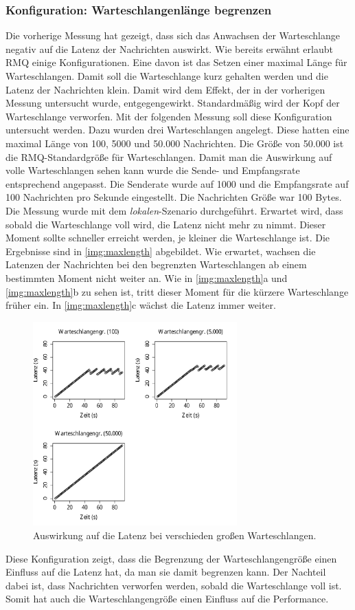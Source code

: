 \subsubsection{Konfiguration: Warteschlangenlänge begrenzen}
\label{sec:maxlength}
Die vorherige Messung hat gezeigt, dass sich das Anwachsen der Warteschlange negativ auf die Latenz der Nachrichten auswirkt. Wie bereits erwähnt erlaubt RMQ einige Konfigurationen. Eine davon ist das Setzen einer maximal Länge für Warteschlangen. Damit soll die Warteschlange kurz gehalten werden und die Latenz der Nachrichten klein. Damit wird dem Effekt, der in der vorherigen Messung untersucht wurde, entgegengewirkt. Standardmäßig wird der Kopf der Warteschlange verworfen. Mit der folgenden Messung soll diese Konfiguration untersucht werden. Dazu wurden drei Warteschlangen angelegt. Diese hatten eine maximal Länge von 100, 5000 und 50.000 Nachrichten. Die Größe von 50.000 ist die RMQ-Standardgröße für Warteschlangen. Damit man die Auswirkung auf volle Warteschlangen sehen kann wurde die Sende- und Empfangsrate entsprechend angepasst. Die Senderate wurde auf 1000 und die Empfangsrate auf 100 Nachrichten pro Sekunde eingestellt. Die Nachrichten Größe war 100 Bytes. Die Messung wurde mit dem \textit{lokalen}-Szenario durchgeführt. Erwartet wird, dass sobald die Warteschlange voll wird, die Latenz nicht mehr zu nimmt. Dieser Moment sollte schneller erreicht werden, je kleiner die Warteschlange ist.
Die Ergebnisse sind in \autoref{img:maxlength} abgebildet. Wie erwartet, wachsen die Latenzen der Nachrichten bei den begrenzten Warteschlangen ab einem bestimmten Moment nicht weiter an. Wie in \autoref{img:maxlength}a und \autoref{img:maxlength}b zu sehen ist, tritt dieser Moment für die kürzere Warteschlange früher ein. In \autoref{img:maxlength}c wächst die Latenz immer weiter.
\begin{figure}
\center
  \includegraphics[width=0.7\textwidth]{images/measurement/max-length.pdf}
  \caption{Auswirkung auf die Latenz bei verschieden großen Warteschlangen.}
  \label{img:maxlength}
\end{figure}
Diese Konfiguration zeigt, dass die Begrenzung der Warteschlangengröße einen Einfluss auf die Latenz hat, da man sie damit begrenzen kann. Der Nachteil dabei ist, dass Nachrichten verworfen werden, sobald die Warteschlange voll ist. Somit hat auch die Warteschlangengröße einen Einfluss auf die Performance. 

